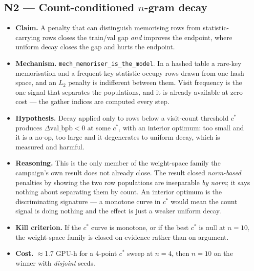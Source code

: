 \documentclass{article}
\newcommand{\vb}{\mathrm{val\_bpb}}
\begin{document}
\subsection{N2 --- Count-conditioned $n$-gram decay}
\begin{itemize}
\item \textbf{Claim.} A penalty that can distinguish memorising rows from statistic-carrying rows closes the train/val gap \emph{and} improves the endpoint, where uniform decay closes the gap and hurts the endpoint.
\item \textbf{Mechanism.} \texttt{mech\_memoriser\_is\_the\_model}. In a hashed table a rare-key memorisation and a frequent-key statistic occupy rows drawn from one hash space, and an $L_2$ penalty is indifferent between them. Visit frequency is the one signal that separates the populations, and it is already available at zero cost --- the gather indices are computed every step.
\item \textbf{Hypothesis.} Decay applied only to rows below a visit-count threshold $c^*$ produces $\Delta\vb < 0$ at some $c^*$, with an interior optimum: too small and it is a no-op, too large and it degenerates to uniform decay, which is measured and harmful.
\item \textbf{Reasoning.} This is the only member of the weight-space family the campaign's own result does not already close. The result closed \emph{norm-based} penalties by showing the two row populations are inseparable \emph{by norm}; it says nothing about separating them by count. An interior optimum is the discriminating signature --- a monotone curve in $c^*$ would mean the count signal is doing nothing and the effect is just a weaker uniform decay.
\item \textbf{Kill criterion.} If the $c^*$ curve is monotone, or if the best $c^*$ is null at $n{=}10$, the weight-space family is closed on evidence rather than on argument.
\item \textbf{Cost.} $\approx$1.7 GPU-h for a 4-point $c^*$ sweep at $n{=}4$, then $n{=}10$ on the winner with \emph{disjoint} seeds.
\end{itemize}
\end{document}
